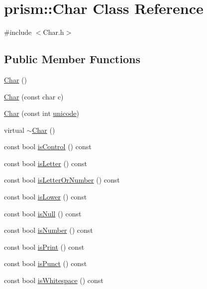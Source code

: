 \hypertarget{classprism_1_1_char}{}\section{prism\+:\+:Char Class Reference}
\label{classprism_1_1_char}


{\ttfamily \#include $<$Char.\+h$>$}

\subsection*{Public Member Functions}
\begin{DoxyCompactItemize}
\item 
\hyperlink{classprism_1_1_char_ae5e69d2f43f9c357cd2abcbf96c835cb}{Char} ()
\item 
\hyperlink{classprism_1_1_char_ad3d23a1b70477b29e1ffdfe8c0c6ac73}{Char} (const char c)
\item 
\hyperlink{classprism_1_1_char_ae2087acf4d77029720cbaecc86f0d8a6}{Char} (const int \hyperlink{classprism_1_1_char_aca9ed86a1bdd3105a97cf60396b8e943}{unicode})
\item 
virtual \hyperlink{classprism_1_1_char_a380f6e37b5bf3ccd5a370ba5fd1b49df}{$\sim$\+Char} ()
\item 
const bool \hyperlink{classprism_1_1_char_a55142ba6fb3b81b089bae99a010db8a7}{is\+Control} () const 
\item 
const bool \hyperlink{classprism_1_1_char_a588ec1d5a5f8533ff6ec7664b93978dc}{is\+Letter} () const 
\item 
const bool \hyperlink{classprism_1_1_char_adfd1a3e0892573b4f7259e1985807fb7}{is\+Letter\+Or\+Number} () const 
\item 
const bool \hyperlink{classprism_1_1_char_af79d4d532aff44db259852b28fdb8890}{is\+Lower} () const 
\item 
const bool \hyperlink{classprism_1_1_char_a9869d8f45403bf30072bfd6d8b7374f1}{is\+Null} () const 
\item 
const bool \hyperlink{classprism_1_1_char_aae5ca384e263d56a9c0dfcc22707e24a}{is\+Number} () const 
\item 
const bool \hyperlink{classprism_1_1_char_aaaf4ddff3e581eb615c134bc59fc6950}{is\+Print} () const 
\item 
const bool \hyperlink{classprism_1_1_char_a573352d2881fc11c90eb0a19b98f0325}{is\+Punct} () const 
\item 
const bool \hyperlink{classprism_1_1_char_a734f3cebcb96e155e9d120a416f7bf74}{is\+Whitespace} () const 

\end{DoxyCompactItemize}
